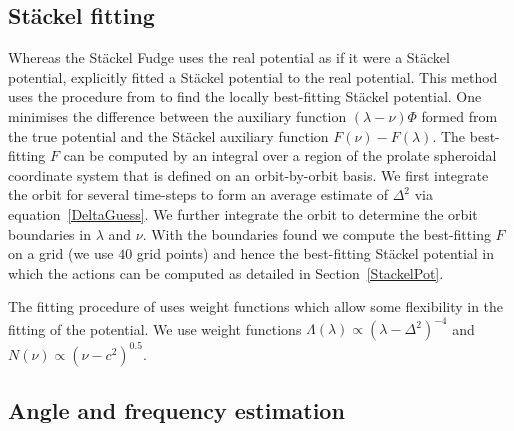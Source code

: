 \documentclass[useAMS,usenatbib,fleqn,a4paper]{mn2e}
\begin{document}
\subsection{St\"ackel fitting}\label{Method::FIT}

Whereas the St\"ackel Fudge uses the real potential as if it were a St\"ackel
potential, \cite{Sanders2012a} explicitly fitted a St\"ackel potential to the
real potential. This method uses the procedure from
\cite{DejonghedeZeeuw1988} to find the locally best-fitting St\"ackel
potential. One minimises the difference between the auxiliary function
$(\lambda-\nu)\Phi$ formed from the true potential and the St\"ackel
auxiliary function $F(\nu)-F(\lambda)$. The best-fitting $F$ can be computed
by an integral over a region of the prolate spheroidal coordinate system
that is defined on an orbit-by-orbit basis. We first integrate the orbit
for several time-steps to form an average estimate of $\Delta^2$ via
equation~\eqref{DeltaGuess}. We further integrate the orbit to determine the
orbit boundaries in $\lambda$ and $\nu$. With the boundaries found we compute
the best-fitting $F$ on a grid (we use $40$ grid points) and hence the
best-fitting St\"ackel potential in which the actions can be computed as
detailed in Section~\ref{StackelPot}.

The fitting procedure of \cite{DejonghedeZeeuw1988} uses weight functions
which allow some flexibility in the fitting of the potential. We use weight
functions $\Lambda(\lambda)\propto (\lambda-\Delta^2)^{-4}$ and
$N(\nu)\propto (\nu-c^2)^{0.5}$.

\subsection{Angle and frequency estimation}\label{Sect::AngleFreq}
\end{document}
